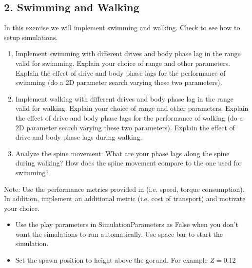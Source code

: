 \documentclass{cmc}
\begin{document}

\newpage
\subsection*{2. Swimming and Walking}\label{sec:swimming-walking}

In this exercise we will implement swimming and walking. Check 
to see how to setup simulations.

\begin{enumerate}
\item Implement swimming with different drives and body phase lag in the range valid for swimming. Explain your choice of range and other parameters.
Explain the effect of drive and body phase lags for the performance of swimming (do a 2D parameter search varying these two parameters).
\item Implement walking with different drives and body phase lag in the range valid for walking. Explain your choice of range and other parameters. Explain the effect of drive and body phase lags for the performance of walking (do a 2D parameter search varying these two parameters).
Explain the effect of drive and body phase lags during walking.
\item Analyze the spine movement: What are your phase lags along the spine
  during walking? How does the spine movement compare to the one used for
  swimming?
\end{enumerate}

Note: Use the performance metrics provided in  (i.e. speed, torque consumption). In addition, implement an additional metric (i.e. cost of transport) and motivate your choice.

\begin{itemize}
  \item Use the play parameters in SimulationParameters as False when you don't want the simulations to run automatically. Use space bar to start the simulation.
  \item Set the spawn position to height above the gorund. For example  $ Z = 0.12$
\end{itemize}

\end{document}
